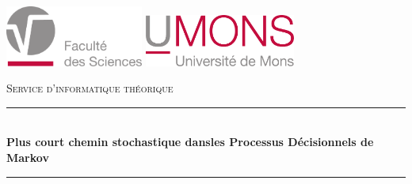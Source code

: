 \documentclass[12pt,a4paper]{report}
\theoremstyle{definition}%
\theoremstyle{remark}
\begin{document}
\begin{titlepage}

	\newcommand{\HRule}{\rule{\linewidth}{0.5mm}} %

	\center %


	\begin{center}
	\includegraphics[height=2cm]{logos/UMONS_FS.pdf}
	\hspace{5cm}
	\includegraphics[height=1.7cm]{logos/UMONS+txt}
	\\[1em]
	\vspace{1cm}
	\end{center}
	\textsc{\large Service d'informatique théorique }\\[0.5cm] %


	\vspace{0.5cm}
	\HRule \\[0.4cm]
	{\huge \bfseries \centering \quad Plus court chemin stochastique dans\newline \newline les Processus Décisionnels  de Markov}\\[0.4cm] %
	\HRule \\[1cm]


\end{titlepage}
\end{document}
